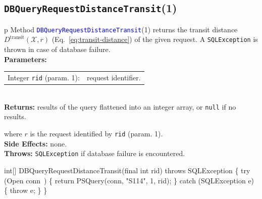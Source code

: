 \subsection{\texttt{DBQueryRequestDistanceTransit}(1)}
\begin{tabular}{p{\textwidth}}
\toprule
{}
Method \textcolor{blue}{{\tt{}\protect{}DBQueryRequestDistanceTransit}}(1) returns the
transit distance $D^\textrm{transit}(\mathcal{X},r)$
(Eq.~\ref{eq:transit-distance}) of the given request.
A {\tt{}SQLException} is thrown in case of database failure.\\
\midrule
\textbf{Parameters:}\\
\begin{tabular}{lp{116mm}}
Integer {\tt{}rid} (param. 1):&request identifier.
\end{tabular}\\
\textbf{Returns:} results of the query flattened into an integer array,
or {\tt{}null} if no results.


where $r$ is the request identified by {\tt{}rid} (param. 1).\\
\textbf{Side Effects:} none.\\
\textbf{Throws:} {\tt{}SQLException} if database failure is encountered.\\
\bottomrule
\end{tabular}
\nwenddocs{}\endmoddef{}
int[] DBQueryRequestDistanceTransit(final int rid) throws SQLException \{
  try (\LA{}Open \code{}conn\edoc{}~{\nwtagstyle{}}\RA{}) \{
    return PSQuery(conn, "S114", 1, rid);
  \} catch (SQLException e) \{
    throw e;
  \}
\}
\eatline
{}\nwendcode{}\nwdocspar

